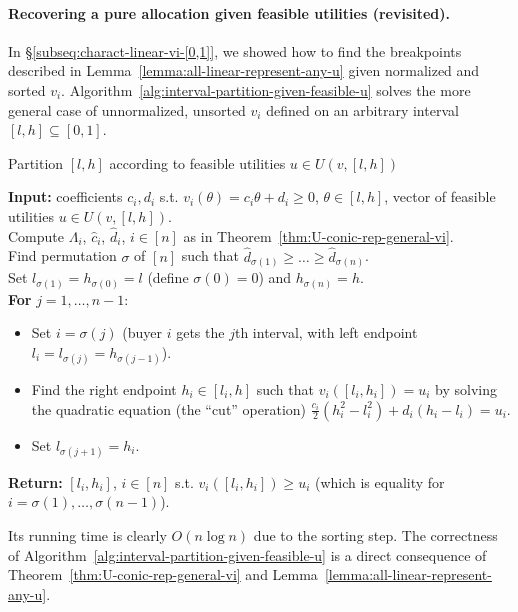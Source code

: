 \paragraph{Recovering a pure allocation given feasible utilities (revisited).}
In \S\ref{subseq:charact-linear-vi-[0,1]}, we showed how to find the breakpoints described in Lemma~\ref{lemma:all-linear-represent-any-u} given normalized and sorted $v_i$. 
Algorithm~\ref{alg:interval-partition-given-feasible-u} solves the more general case of unnormalized, unsorted $v_i$ defined on an arbitrary interval $[l,h] \subseteq [0,1]$. 
\begin{algorithm}
	\caption{Partition $[l,h]$ according to feasible utilities $u\in U(v, [l,h])$}
	\textbf{Input:} coefficients $c_i, d_i$ s.t. $v_i(\theta) = c_i\theta + d_i \geq 0$, $\theta\in [l,h]$, vector of feasible utilities $u\in U(v, [l, h])$. \\
	Compute $\Lambda_i$, $\hat{c}_i$, $\hat{d}_i$, $i\in [n]$ as in Theorem~\ref{thm:U-conic-rep-general-vi}. \\
	Find permutation $\sigma$ of $[n]$ such that $\hat{d}_{\sigma(1)} \geq \dots \geq \hat{d}_{\sigma(n)}$. \\
	Set $l_{\sigma(1)} = h_{\sigma(0)} = l$ (define $\sigma(0)  = 0$) and $h_{\sigma(n)} = h$.\\
	\textbf{For} $j = 1, \dots, n-1$:
	\begin{itemize}
		\item Set $i = \sigma(j)$ (buyer $i$ gets the $j$th interval, with left endpoint $l_i = l_{\sigma(j)} = h_{\sigma(j-1)}$).
		\item Find the right endpoint $h_i\in [l_i, h]$ such that $v_i([l_i, h_i]) = u_i$ by solving the quadratic equation (the ``cut'' operation)
		$\frac{c_i}{2}(h_i^2 - l_i^2) + d_i(h_i - l_i) = u_i$.
		\item Set $l_{\sigma(j+1)} = h_i$.
	\end{itemize}

	 \textbf{Return:} $[l_i, h_i]$, $i\in [n]$ s.t. $v_i([l_i, h_i])\geq u_i$ (which is equality for $i=\sigma(1), \dots, \sigma(n-1)$).
	\label{alg:interval-partition-given-feasible-u}
\end{algorithm}
Its running time is clearly $O(n\log n)$ due to the sorting step. 
The correctness of Algorithm~\ref{alg:interval-partition-given-feasible-u} is a direct consequence of Theorem~\ref{thm:U-conic-rep-general-vi} and Lemma~\ref{lemma:all-linear-represent-any-u}. 

